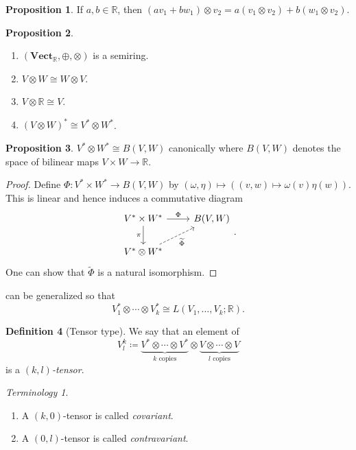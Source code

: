 \documentclass[10pt,letterpaper,cm]{nupset}
\theoremstyle{definition}
\newtheorem{definition}{Definition}[subsection]
\theoremstyle{theorem}
\newtheorem{prop}[definition]{Proposition}
\theoremstyle{remark}
\newtheorem*{term}{Terminology}
\newcommand{\R}{\mathbb R}
\newcommand{\1}{\mathbf{1}}
\newcommand{\0}{\vec 0}
\begin{document}
\begin{prop}
If $a,b \in \R$, then $(av_1 + bw_1) \otimes v_2 = a(v_1 \otimes v_2) + b(w_1 \otimes v_2)$.
\end{prop}

\begin{prop} $ $
\begin{enumerate}
\item $\left(\mathbf{Vect}_{\R}, \oplus, \otimes\right)$ is a semiring. 
\item $V \otimes W \cong W \otimes V$.
\item $V \otimes \R \cong V$.
\item $(V \otimes W)^{\ast} \cong V^{\ast} \otimes W^{\ast}$.
\end{enumerate}
\end{prop}

\begin{prop}\label{isom}
$V^{\ast} \otimes W^{\ast} \cong B(V, W)$ canonically where $B(V, W)$ denotes the space of bilinear maps $V \times W \to \R$.
\end{prop}
\begin{proof}
Define $\Phi : V^{\ast} \times W^{\ast} \to B(V, W)$ by $(\omega, \eta) \mapsto \left((v, w) \mapsto \omega(v) \eta(w)\right)$.
This is linear and hence induces a commutative diagram
\[
\begin{tikzcd}
V^{\ast}\times W^{\ast} \arrow[d, "\pi"'] \arrow[r, "\Phi"] & {B(V, W)} \\
V^{\ast} \otimes W^{\ast} \arrow[ru, "{\widetilde{\Phi}}"', dashed] & 
\end{tikzcd} .
\]
One can show that $\tilde{\Phi}$ is a natural isomorphism.
\end{proof}

 can be generalized so that $$V_1^{\ast} \otimes \cdots \otimes V_k^{\ast} \cong L(V_1, \ldots, V_k; \R). $$

\begin{definition}[Tensor type]
We say that an element of $$V_l^k\coloneqq  \underbrace{V^{\ast} \otimes \cdots \otimes V^{\ast}}_{k \text{ copies}} \otimes \underbrace{V \otimes \cdots \otimes V}_{l \text{ copies}}$$ is a \textit{$(k, l)$-tensor}. 
\end{definition}

\begin{term} $ $
\begin{enumerate}
\item A $(k, 0)$-tensor is called \textit{covariant}. 
\item A $(0, l)$-tensor is called \textit{contravariant}.
\end{enumerate}
\end{term}
\end{document}

